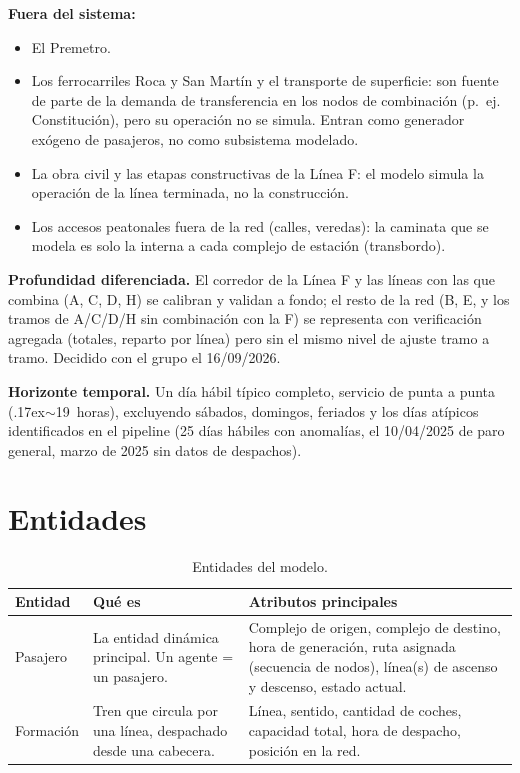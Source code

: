\documentclass{article}
\begin{document}
\textbf{Fuera del sistema:}
\begin{itemize}
  \item El Premetro.
  \item Los ferrocarriles Roca y San Martín y el transporte de superficie: son fuente
    de parte de la demanda de transferencia en los nodos de combinación (p.~ej.
    Constitución), pero su operación no se simula. Entran como generador exógeno de
    pasajeros, no como subsistema modelado.
  \item La obra civil y las etapas constructivas de la Línea F: el modelo simula la
    operación de la línea terminada, no la construcción.
  \item Los accesos peatonales fuera de la red (calles, veredas): la caminata que se
    modela es solo la interna a cada complejo de estación (transbordo).
\end{itemize}

\textbf{Profundidad diferenciada.} El corredor de la Línea F y las líneas con las
que combina (A, C, D, H) se calibran y validan a fondo; el resto de la red (B, E, y
los tramos de A/C/D/H sin combinación con la F) se representa con verificación
agregada (totales, reparto por línea) pero sin el mismo nivel de ajuste tramo a
tramo. Decidido con el grupo el 16/09/2026.

\textbf{Horizonte temporal.} Un día hábil típico completo, servicio de punta a
punta (\raise.17ex\hbox{$\scriptstyle\sim$}19~horas), excluyendo sábados, domingos,
feriados y los días atípicos identificados en el pipeline (25 días hábiles con
anomalías, el 10/04/2025 de paro general, marzo de 2025 sin datos de despachos).

\section{Entidades}

\begin{table}[H]
\centering
\small
\begin{tabular}{@{}L{2.6cm}L{4.5cm}L{7cm}@{}}
\toprule
Entidad & Qué es & Atributos principales \\
\midrule
Pasajero & La entidad dinámica principal. Un agente = un pasajero. & Complejo de
  origen, complejo de destino, hora de generación, ruta asignada (secuencia de
  nodos), línea(s) de ascenso y descenso, estado actual. \\
Formación & Tren que circula por una línea, despachado desde una cabecera. & Línea,
  sentido, cantidad de coches, capacidad total, hora de despacho, posición en la
  red. \\
\bottomrule
\end{tabular}
\caption{Entidades del modelo.}
\end{table}
\end{document}
